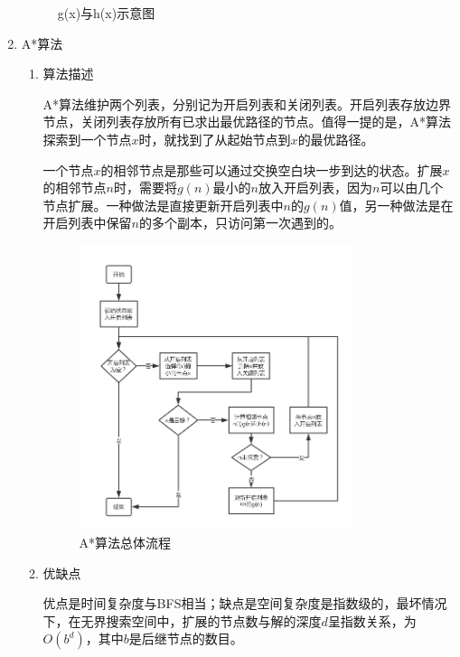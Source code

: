 \documentclass[10pt,letterpaper]{ctexart}
\begin{document}
\begin{enumerate}[itemindent=2.5em,label=\arabic*、]
\begin{figure}[H]
    \caption{g(x)与h(x)示意图}
    \label{fig:informed}
    \end{figure}
    \item A*算法
    \begin{enumerate}[itemindent=1.5em,label=（\arabic*）]
      \item 算法描述
      \par \qquad A*算法维护两个列表，分别记为开启列表和关闭列表。开启列表存放边界节点，关闭列表存放所有已求出最优路径的节点。值得一提的是，A*算法探索到一个节点$x$时，就找到了从起始节点到$x$的最优路径。
      \par \qquad 一个节点$x$的相邻节点是那些可以通过交换空白块一步到达的状态。扩展$x$的相邻节点$n$时，需要将$g(n)$最小的$n$放入开启列表，因为$n$可以由几个节点扩展。一种做法是直接更新开启列表中$n$的$g(n)$值，另一种做法是在开启列表中保留$n$的多个副本，只访问第一次遇到的。
      \begin{figure}[H]
      \centering
      \includegraphics[width=0.8\textwidth]{astar.png}
      \caption{A*算法总体流程}
      \label{fig:astar}
      \end{figure}
      \item 优缺点
      \par \qquad 优点是时间复杂度与BFS相当；缺点是空间复杂度是指数级的，最坏情况下，在无界搜索空间中，扩展的节点数与解的深度$d$呈指数关系，为$O(b^d)$，其中$b$是后继节点的数目。
    \end{enumerate}


\end{enumerate}
\end{document}
